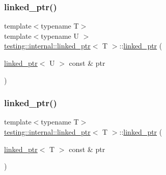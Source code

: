 \mbox{\label{classtesting_1_1internal_1_1linked__ptr_a7597ed91006edd0467c99bd1aaab07f5}} 
\subsubsection{\texorpdfstring{linked\+\_\+ptr()}{linked\_ptr()}\hspace{0.1cm}{\footnotesize\ttfamily [2/3]}}
{\footnotesize\ttfamily template$<$typename T$>$ \\
template$<$typename U $>$ \\
\hyperlink{classtesting_1_1internal_1_1linked__ptr}{testing\+::internal\+::linked\+\_\+ptr}$<$ T $>$\+::\hyperlink{classtesting_1_1internal_1_1linked__ptr}{linked\+\_\+ptr} (\begin{DoxyParamCaption}\item[{\hyperlink{classtesting_1_1internal_1_1linked__ptr}{linked\+\_\+ptr}$<$ U $>$ const \&}]{ptr }\end{DoxyParamCaption})\hspace{0.3cm}{\ttfamily [inline]}}

\mbox{\label{classtesting_1_1internal_1_1linked__ptr_abc076b5678cc7f64306d5ecfefc93aff}} 
\subsubsection{\texorpdfstring{linked\+\_\+ptr()}{linked\_ptr()}\hspace{0.1cm}{\footnotesize\ttfamily [3/3]}}
{\footnotesize\ttfamily template$<$typename T$>$ \\
\hyperlink{classtesting_1_1internal_1_1linked__ptr}{testing\+::internal\+::linked\+\_\+ptr}$<$ T $>$\+::\hyperlink{classtesting_1_1internal_1_1linked__ptr}{linked\+\_\+ptr} (\begin{DoxyParamCaption}\item[{\hyperlink{classtesting_1_1internal_1_1linked__ptr}{linked\+\_\+ptr}$<$ T $>$ const \&}]{ptr }\end{DoxyParamCaption})\hspace{0.3cm}{\ttfamily [inline]}}



